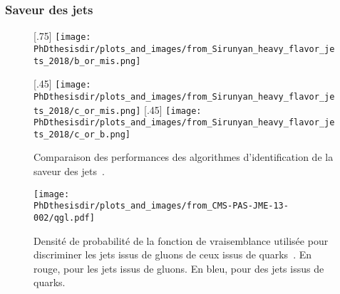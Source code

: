 \subsubsection{Saveur des jets}\label{chapter-CMS-section-jets_reco-subsec-flavor}
\begin{figure}[p]
\centering

[.75\textwidth]
{\texttt{[image: \\PhDthesisdir/plots\_and\_images/from\_Sirunyan\_heavy\_flavor\_jets\_2018/b\_or\_mis.png]}}

\vspace{\baselineskip}

[.45\textwidth]
{\texttt{[image: \\PhDthesisdir/plots\_and\_images/from\_Sirunyan\_heavy\_flavor\_jets\_2018/c\_or\_mis.png]}}
\hfill
{}[.45\textwidth]
{\texttt{[image: \\PhDthesisdir/plots\_and\_images/from\_Sirunyan\_heavy\_flavor\_jets\_2018/c\_or\_b.png]}}

\caption[Performances des algorithmes d'identification de la saveur des jets.]{Comparaison des performances des algorithmes d'identification de la saveur des jets~\cite{Sirunyan_heavy_flavor_jets_2018}.}
\label{fig-chapter-CMS-section-jets_reco-subsec-flavor-bc_tag_roc_curves}
\end{figure}
\begin{figure}[p]
\centering
\texttt{[image: \\PhDthesisdir/plots\_and\_images/from\_CMS-PAS-JME-13-002/qgl.pdf]}
\caption[Performances de la discrimation quark-gluon pour la saveur des jets.]{Densité de probabilité de la fonction de vraisemblance utilisée pour discriminer les jets issus de gluons de ceux issus de quarks~\cite{CMS-PAS-JME-13-002}. En rouge, pour les jets issus de gluons. En bleu, pour des jets issus de quarks.}
\label{fig-chapter-CMS-section-jets_reco-subsec-flavor-qgl_likelihood}
\end{figure}
